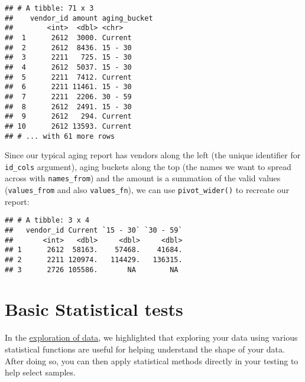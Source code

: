 \documentclass[
]{book}
\newenvironment{Shaded}{\begin{snugshade}}{\end{snugshade}}
\newcommand{\DataTypeTok}[1]{\textcolor[rgb]{0.13,0.29,0.53}{#1}}
\newcommand{\KeywordTok}[1]{\textcolor[rgb]{0.13,0.29,0.53}{\textbf{#1}}}
\newcommand{\NormalTok}[1]{#1}
\newcommand{\OperatorTok}[1]{\textcolor[rgb]{0.81,0.36,0.00}{\textbf{#1}}}
\newcommand{\StringTok}[1]{\textcolor[rgb]{0.31,0.60,0.02}{#1}}
\begin{document}
\begin{verbatim}
## # A tibble: 71 x 3
##    vendor_id amount aging_bucket
##        <int>  <dbl> <chr>       
##  1      2612  3000. Current     
##  2      2612  8436. 15 - 30     
##  3      2211   725. 15 - 30     
##  4      2612  5037. 15 - 30     
##  5      2211  7412. Current     
##  6      2211 11461. 15 - 30     
##  7      2211  2206. 30 - 59     
##  8      2612  2491. 15 - 30     
##  9      2612   294. Current     
## 10      2612 13593. Current     
## # ... with 61 more rows
\end{verbatim}

Since our typical aging report has vendors along the left (the unique identifier for \texttt{id\_cols} argument), aging buckets along the top (the names we want to spread across with \texttt{names\_from}) and the amount is a summation of the valid values (\texttt{values\_from} and also \texttt{values\_fn}), we can use \texttt{pivot\_wider()} to recreate our report:

\begin{Shaded}
\end{Shaded}

\begin{verbatim}
## # A tibble: 3 x 4
##   vendor_id Current `15 - 30` `30 - 59`
##       <int>   <dbl>     <dbl>     <dbl>
## 1      2612  58163.    57468.    41684.
## 2      2211 120974.   114429.   136315.
## 3      2726 105586.       NA        NA
\end{verbatim}

\hypertarget{basic-statistical-tests}{%
\section{Basic Statistical tests}\label{basic-statistical-tests}}

In the \protect\hyperlink{explore-stats}{exploration of data}, we highlighted that exploring your data using various statistical functions are useful for helping understand the shape of your data. After doing so, you can then apply statistical methods directly in your testing to help select samples.
\end{document}
